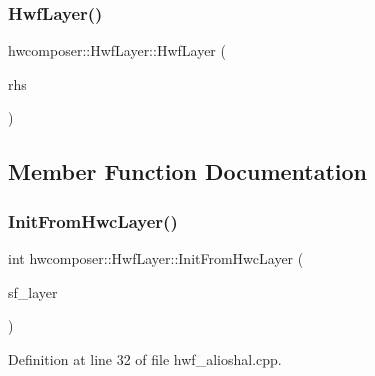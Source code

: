\mbox{\label{structhwcomposer_1_1HwfLayer_a5d306079ca0f1c7995b54b1415e6ca32}} 
\subsubsection{\texorpdfstring{Hwf\+Layer()}{HwfLayer()}\hspace{0.1cm}{\footnotesize\ttfamily [2/2]}}
{\footnotesize\ttfamily hwcomposer\+::\+Hwf\+Layer\+::\+Hwf\+Layer (\begin{DoxyParamCaption}\item[{const \mbox{\hyperlink{structhwcomposer_1_1HwfLayer}{Hwf\+Layer}} \&}]{rhs }\end{DoxyParamCaption})\hspace{0.3cm}{\ttfamily [delete]}}



\subsection{Member Function Documentation}
\mbox{\label{structhwcomposer_1_1HwfLayer_a78c4b1590cf54cfad77fc3382cce9ce5}} 
\subsubsection{\texorpdfstring{Init\+From\+Hwc\+Layer()}{InitFromHwcLayer()}}
{\footnotesize\ttfamily int hwcomposer\+::\+Hwf\+Layer\+::\+Init\+From\+Hwc\+Layer (\begin{DoxyParamCaption}\item[{hwf\+\_\+layer\+\_\+t $\ast$}]{sf\+\_\+layer }\end{DoxyParamCaption})}



Definition at line 32 of file hwf\+\_\+alioshal.\+cpp.


